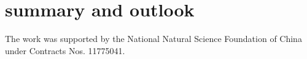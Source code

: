 \documentclass[%
reprint,
superscriptaddress,
showpacs,preprintnumbers,
 amsmath,amssymb,
 aps,
prd,
]{revtex4-1}
\begin{document}
\section{summary and outlook}
\label{sec:SO}

\begin{acknowledgments}

The work was supported by the National Natural Science Foundation of China under Contracts Nos. 11775041.

\end{acknowledgments}



\end{document}
